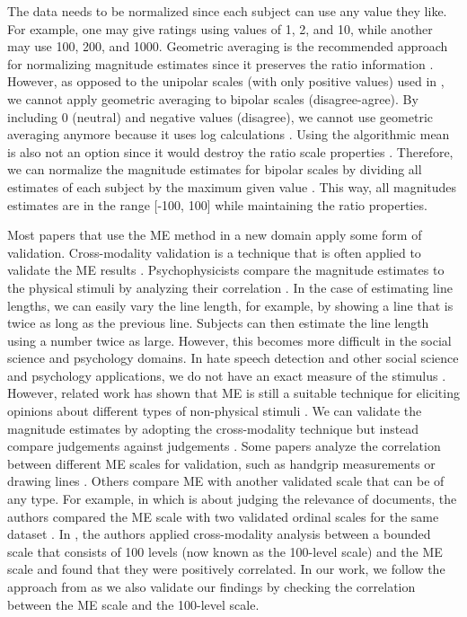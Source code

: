 %
The data needs to be normalized since each subject can use any value they like.
%
For example, one may give ratings using values of 1, 2, and 10, while another may use 100, 200, and 1000.
%
Geometric averaging is the recommended approach for normalizing magnitude estimates since it preserves the ratio information \citep{moskowitz1977magnitude, mcgee2004master, maddalena2017crowdsourcing}.
%
However, as opposed to the unipolar scales (with only positive values) used in \citet{bard1996magnitude, mcgee2004master, maddalena2017crowdsourcing}, we cannot apply geometric averaging to bipolar scales (disagree-agree).
%
By including 0 (neutral) and negative values (disagree), we cannot use geometric averaging anymore because it uses log calculations \citep{moskowitz1977magnitude}.
%
Using the algorithmic mean is also not an option since it would destroy the ratio scale properties \citep{moskowitz1977magnitude}.
%
Therefore, we can normalize the magnitude estimates for bipolar scales by dividing all estimates of each subject by the maximum given value \citep{moskowitz1977magnitude}.
%
This way, all magnitudes estimates are in the range [-100, 100] while maintaining the ratio properties.
%

%
Most papers that use the ME method in a new domain apply some form of validation. Cross-modality validation is a technique that is often applied to validate the ME results \citep{bard1996magnitude}.
%
Psychophysicists compare the magnitude estimates to the physical stimuli by analyzing their correlation \citep{bard1996magnitude}.
%
In the case of estimating line lengths, we can easily vary the line length, for example, by showing a line that is twice as long as the previous line.
%
Subjects can then estimate the line length using a number twice as large.
%
However, this becomes more difficult in the social science and psychology domains.
%
In hate speech detection and other social science and psychology applications, we do not have an exact measure of the stimulus \citep{bard1996magnitude}.
%
However, related work has shown that ME is still a suitable technique for eliciting opinions about different types of non-physical stimuli \citep{bard1996magnitude, mcgee2004master, maddalena2017crowdsourcing, lodge1979comparisons}.
%
We can validate the magnitude estimates by adopting the cross-modality technique but instead compare judgements against judgements \citep{bard1996magnitude, lodge1979comparisons}.
%
Some papers analyze the correlation between different ME scales for validation, such as handgrip measurements or drawing lines \citep{bard1996magnitude, lodge1976calibration}.
%
Others compare ME with another validated scale that can be of any type.
%
For example, in \citet{maddalena2017crowdsourcing} which is about judging the relevance of documents, the authors compared the ME scale with two validated ordinal scales for the same dataset \citep{maddalena2017crowdsourcing}.
%
In \citet{roitero2018fine}, the authors applied cross-modality analysis between a bounded scale that consists of 100 levels (now known as the 100-level scale) and the ME scale and found that they were positively correlated.
%
In our work, we follow the approach from \citet{roitero2018fine} as we also validate our findings by checking the correlation between the ME scale and the 100-level scale.
%

